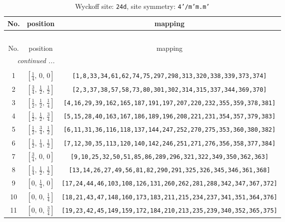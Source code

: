 \documentclass[fleqn,8pt]{jsarticle}
\begin{document}
\begin{longtable}{ccc}
\caption{Wyckoff site: {\tt 24d}, site symmetry: {\tt 4'/m'm.m'}}
 \\
 \hline \hline
No. & position & mapping \\ \hline \endfirsthead

\multicolumn{2}{l}{\tablename\ \thetable{}} \\
 \hline \hline
No. & position & mapping \\ \hline \endhead

 \hline \hline
\multicolumn{2}{r}{\footnotesize\it continued ...} \\ \endfoot

 \hline \hline
\multicolumn{2}{r}{} \\ \endlastfoot

1 & $\left[ \frac{1}{4},\, 0,\, 0 \right]$ & {\tt [1,8,33,34,61,62,74,75,297,298,313,320,338,339,373,374]} \\ \hline
2 & $\left[ \frac{3}{4},\, \frac{1}{2},\, \frac{1}{2} \right]$ & {\tt [2,3,37,38,57,58,73,80,301,302,314,315,337,344,369,370]} \\ \hline
3 & $\left[ \frac{1}{2},\, \frac{1}{2},\, \frac{1}{4} \right]$ & {\tt [4,16,29,39,162,165,187,191,197,207,220,232,355,359,378,381]} \\ \hline
4 & $\left[ \frac{1}{2},\, \frac{1}{2},\, \frac{3}{4} \right]$ & {\tt [5,15,28,40,163,167,186,189,196,208,221,231,354,357,379,383]} \\ \hline
5 & $\left[ \frac{1}{2},\, \frac{3}{4},\, \frac{1}{2} \right]$ & {\tt [6,11,31,36,116,118,137,144,247,252,270,275,353,360,380,382]} \\ \hline
6 & $\left[ \frac{1}{2},\, \frac{1}{4},\, \frac{1}{2} \right]$ & {\tt [7,12,30,35,113,120,140,142,246,251,271,276,356,358,377,384]} \\ \hline
7 & $\left[ \frac{3}{4},\, 0,\, 0 \right]$ & {\tt [9,10,25,32,50,51,85,86,289,296,321,322,349,350,362,363]} \\ \hline
8 & $\left[ \frac{1}{4},\, \frac{1}{2},\, \frac{1}{2} \right]$ & {\tt [13,14,26,27,49,56,81,82,290,291,325,326,345,346,361,368]} \\ \hline
9 & $\left[ 0,\, \frac{1}{4},\, 0 \right]$ & {\tt [17,24,44,46,103,108,126,131,260,262,281,288,342,347,367,372]} \\ \hline
10 & $\left[ 0,\, 0,\, \frac{1}{4} \right]$ & {\tt [18,21,43,47,148,160,173,183,211,215,234,237,341,351,364,376]} \\ \hline
11 & $\left[ 0,\, 0,\, \frac{3}{4} \right]$ & {\tt [19,23,42,45,149,159,172,184,210,213,235,239,340,352,365,375]} \\ \hline

\end{longtable}
\end{document}
